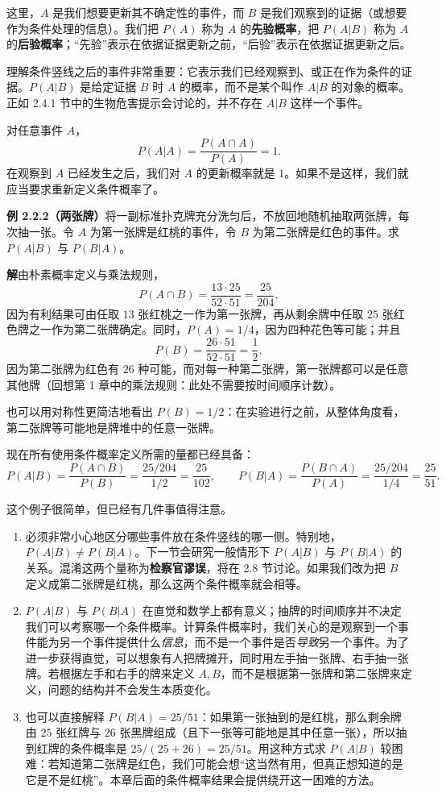 \documentclass[UTF8, 12pt, fontset=fandol, oneside]{ctexart}
\begin{document}
这里，$A$ 是我们想要更新其不确定性的事件，而 $B$ 是我们观察到的证据（或想要作为条件处理的信息）。我们把 $P(A)$ 称为 $A$ 的\textbf{先验概率}，把 $P(A|B)$ 称为 $A$ 的\textbf{后验概率}；“先验”表示在依据证据更新之前，“后验”表示在依据证据更新之后。

理解条件竖线之后的事件非常重要：它表示我们已经观察到、或正在作为条件的证据。$P(A|B)$ 是给定证据 $B$ 时 $A$ 的概率，而不是某个叫作 $A|B$ 的对象的概率。正如 2.4.1 节中的生物危害提示会讨论的，并不存在 $A|B$ 这样一个事件。

对任意事件 $A$，
\[
  P(A|A)=\frac{P(A\cap A)}{P(A)}=1.
\]
在观察到 $A$ 已经发生之后，我们对 $A$ 的更新概率就是 $1$。如果不是这样，我们就应当要求重新定义条件概率了。

\noindent\textbf{例 2.2.2（两张牌）}\quad 将一副标准扑克牌充分洗匀后，不放回地随机抽取两张牌，每次抽一张。令 $A$ 为第一张牌是红桃的事件，令 $B$ 为第二张牌是红色的事件。求 $P(A|B)$ 与 $P(B|A)$。

\noindent\textbf{解}\quad 由朴素概率定义与乘法规则，
\[
  P(A\cap B)=\frac{13\cdot 25}{52\cdot 51}=\frac{25}{204},
\]
因为有利结果可由任取 $13$ 张红桃之一作为第一张牌，再从剩余牌中任取 $25$ 张红色牌之一作为第二张牌确定。同时，$P(A)=1/4$，因为四种花色等可能；并且
\[
  P(B)=\frac{26\cdot 51}{52\cdot 51}=\frac12,
\]
因为第二张牌为红色有 $26$ 种可能，而对每一种第二张牌，第一张牌都可以是任意其他牌（回想第 1 章中的乘法规则：此处不需要按时间顺序计数）。

也可以用对称性更简洁地看出 $P(B)=1/2$：在实验进行之前，从整体角度看，第二张牌等可能地是牌堆中的任意一张牌。

现在所有使用条件概率定义所需的量都已经具备：
\[
  P(A|B)=\frac{P(A\cap B)}{P(B)}
  =\frac{25/204}{1/2}=\frac{25}{102},
  \qquad
  P(B|A)=\frac{P(B\cap A)}{P(A)}
  =\frac{25/204}{1/4}=\frac{25}{51}.
\]

这个例子很简单，但已经有几件事值得注意。

\begin{enumerate}
  \item 必须非常小心地区分哪些事件放在条件竖线的哪一侧。特别地，$P(A|B)\ne P(B|A)$。下一节会研究一般情形下 $P(A|B)$ 与 $P(B|A)$ 的关系。混淆这两个量称为\textbf{检察官谬误}，将在 2.8 节讨论。如果我们改为把 $B$ 定义成第二张牌是红桃，那么这两个条件概率就会相等。
  \item $P(A|B)$ 与 $P(B|A)$ 在直觉和数学上都有意义；抽牌的时间顺序并不决定我们可以考察哪一个条件概率。计算条件概率时，我们关心的是观察到一个事件能为另一个事件提供什么\textit{信息}，而不是一个事件是否\textit{导致}另一个事件。为了进一步获得直觉，可以想象有人把牌摊开，同时用左手抽一张牌、右手抽一张牌。若根据左手和右手的牌来定义 $A,B$，而不是根据第一张牌和第二张牌来定义，问题的结构并不会发生本质变化。
  \item 也可以直接解释 $P(B|A)=25/51$：如果第一张抽到的是红桃，那么剩余牌由 $25$ 张红牌与 $26$ 张黑牌组成（且下一张等可能地是其中任意一张），所以抽到红牌的条件概率是 $25/(25+26)=25/51$。用这种方式求 $P(A|B)$ 较困难：若知道第二张牌是红色，我们可能会想“这当然有用，但真正想知道的是它是不是红桃”。本章后面的条件概率结果会提供绕开这一困难的方法。
\end{enumerate}
\end{document}
